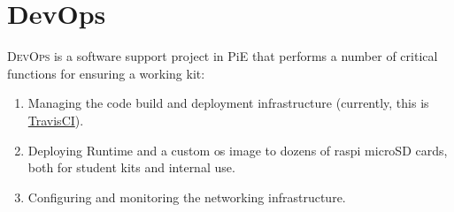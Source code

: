 \documentclass[12pt]{book}
\begin{document}

  \chapter{DevOps}

  \textsc{DevOps} is a software support project in PiE that performs a number of critical functions for ensuring a working kit:
  \begin{enumerate}
    \item Managing the code build and deployment infrastructure (currently, this is \href{https://travis-ci.org/pioneers/PieCentral}{TravisCI}).
    \item Deploying Runtime and a custom \gls{os} \gls{image} to dozens of \gls{raspi} microSD cards, both for student kits and internal use.
    \item Configuring and monitoring the networking infrastructure.
  \end{enumerate}
\end{document}
